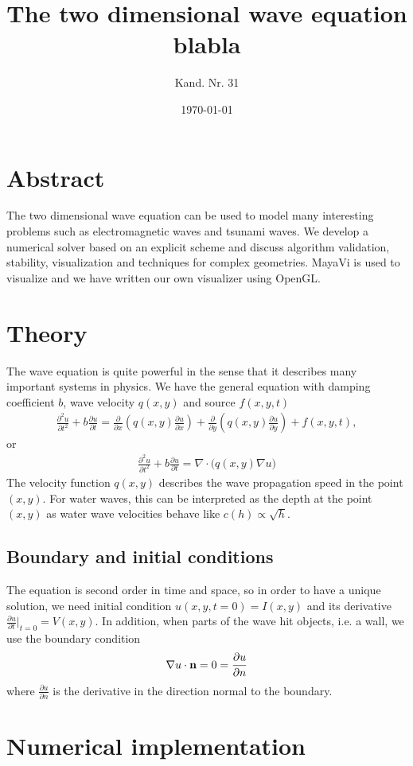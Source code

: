 \documentclass[a4paper,10pt]{article}
\title{The two dimensional wave equation blabla}
\date{\today}
\author{Kand. Nr. 31}
\renewcommand{\(}{\left(}
\renewcommand{\)}{\right)}
\newcommand{\dpart}[2]{\frac{\partial#1}{\partial#2}}
\begin{document}
\section*{Abstract}
The two dimensional wave equation can be used to model many interesting problems such as electromagnetic waves and tsunami waves. We develop a numerical solver based on an explicit scheme and discuss algorithm validation, stability, visualization and techniques for complex geometries. MayaVi is used to visualize and we have written our own visualizer using OpenGL.

\section*{Theory}
The wave equation is quite powerful in the sense that it describes many important systems in physics. We have the general equation with damping coefficient $b$, wave velocity $q(x,y)$ and source $f(x,y,t)$
\begin{align}
\frac{\partial^2 u}{\partial t^2} + b\frac{\partial u}{\partial t} =
\frac{\partial}{\partial x}\left( q (x,y)
\frac{\partial u}{\partial x}\right) +
\frac{\partial}{\partial y}\left( q (x,y)
\frac{\partial u}{\partial y}\right) + f(x,y,t),
\end{align}
or
\begin{align}
\frac{\partial^2 u}{\partial t^2} + b\frac{\partial u}{\partial t} =
\nabla \cdot \big(q(x,y) \nabla u \big )
\end{align}
The velocity function $q(x,y)$ describes the wave propagation speed in the point $(x,y)$. For water waves, this can be interpreted as the depth at the point $(x,y)$ as water wave velocities behave like $c(h) \propto \sqrt h$. 
\subsection*{Boundary and initial conditions}
The equation is second order in time and space, so in order to have a unique solution, we need initial condition $u(x,y,t=0) = I(x,y)$ and its derivative $\dpart{u}{t}|_{t=0}=V(x,y)$. In addition, when parts of the wave hit objects, i.e. a wall, we use the boundary condition
\begin{align*}
\nabla u\cdot \textbf n = 0 = \dpart{u}{n}
\end{align*}
where $\dpart{u}{n}$ is the derivative in the direction normal to the boundary. 
\section*{Numerical implementation}
\end{document}
